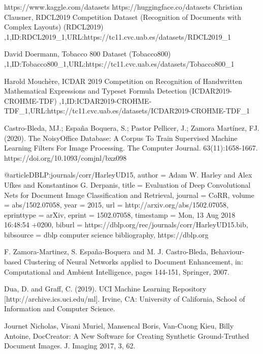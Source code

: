 \documentclass[runningheads]{llncs}
\begin{document}
\begin{thebibliography}{8}
  https://www.kaggle.com/datasets
  {https://huggingface.co/datasets}
{Christian Clausner, RDCL2019 Competition Dataset (Recognition of Documents with Complex Layouts) (RDCL2019) ,1,ID:RDCL2019\_1,URL:https://tc11.cvc.uab.es/datasets/RDCL2019_1}

{David Doermann, Tobacco 800 Dataset (Tobacco800) ,1,ID:Tobacco800_1,URL:https://tc11.cvc.uab.es/datasets/Tobacco800_1}

{Harold Mouchère, ICDAR 2019 Competition on Recognition of Handwritten Mathematical Expressions and Typeset Formula Detection (ICDAR2019-CROHME-TDF) ,1,ID:ICDAR2019-CROHME-TDF\_1,URL:https://tc11.cvc.uab.es/datasets/ICDAR2019-CROHME-TDF_1}

{Castro-Bleda, MJ.; España Boquera, S.; Pastor Pellicer, J.; Zamora Martínez, FJ. (2020). The NoisyOffice Database: A Corpus To Train Supervised Machine Learning Filters For Image Processing. The Computer Journal. 63(11):1658-1667. https://doi.org/10.1093/comjnl/bxz098}

  @article{DBLP:journals/corr/HarleyUD15,
  author    = {Adam W. Harley and
               Alex Ufkes and
               Konstantinos G. Derpanis},
  title     = {Evaluation of Deep Convolutional Nets for Document Image Classification
               and Retrieval},
  journal   = {CoRR},
  volume    = {abs/1502.07058},
  year      = {2015},
  url       = {http://arxiv.org/abs/1502.07058},
  eprinttype = {arXiv},
  eprint    = {1502.07058},
  timestamp = {Mon, 13 Aug 2018 16:48:54 +0200},
  biburl    = {https://dblp.org/rec/journals/corr/HarleyUD15.bib},
  bibsource = {dblp computer science bibliography, https://dblp.org}
}

{F. Zamora-Martinez, S. España-Boquera and M. J. Castro-Bleda, Behaviour-based Clustering of Neural Networks applied to Document Enhancement, in: Computational and Ambient Intelligence, pages 144-151, Springer, 2007.}

{Dua, D. and Graff, C. (2019). UCI Machine Learning Repository [http://archive.ics.uci.edu/ml]. Irvine, CA: University of California, School of Information and Computer Science.}

  {Journet Nicholas, Visani Muriel, Mansencal Boris, Van-Cuong Kieu, Billy Antoine, DocCreator: A New Software for Creating Synthetic Ground-Truthed Document Images. J. Imaging 2017, 3, 62.}
\end{thebibliography}
\end{document}
